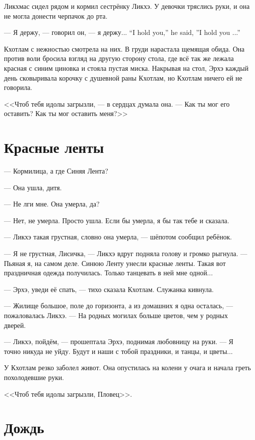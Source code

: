 Ликхмас сидел рядом и кормил сестрёнку Ликхэ.
У девочки тряслись руки, и она не могла донести черпачок до рта.

{--- Я держу, --- говорил он, --- я держу...}
{``I hold you,'' he said, ''I hold you ...''}

Кхотлам с нежностью смотрела на них.
В груди нарастала щемящая обида.
Она против воли бросила взгляд на другую сторону стола, где всё так же лежала красная с синим циновка и стояла пустая миска.
Накрывая на стол, Эрхэ каждый день сковыривала корочку с душевной раны Кхотлам, но Кхотлам ничего ей не говорила.

<<Чтоб тебя идолы загрызли, --- в сердцах думала она.
--- Как ты мог его оставить?
Как ты мог оставить меня?>>

\section{Красные ленты}

--- Кормилица, а где Синяя Лента?

--- Она ушла, дитя.

--- Не лги мне.
Она умерла, да?

--- Нет, не умерла.
Просто ушла.
Если бы умерла, я бы так тебе и сказала.

--- Ликхэ такая грустная, словно она умерла, --- шёпотом сообщил ребёнок.

--- Я не грустная, Лисичка, --- Ликхэ вдруг подняла голову и громко рыгнула.
--- Пьяная я, на самом деле.
Синюю Ленту унесли красные ленты.
Такая вот праздничная одежда получилась.
Только танцевать в ней мне одной...

--- Эрхэ, уведи её спать, --- тихо сказала Кхотлам.
Служанка кивнула.

--- Жилище большое, поле до горизонта, а из домашних я одна осталась, --- пожаловалась Ликхэ.
--- На родных могилах больше цветов, чем у родных дверей.

--- Ликхэ, пойдём, --- прошептала Эрхэ, поднимая любовницу на руки.
--- Я точно никуда не уйду.
Будут и наши с тобой праздники, и танцы, и цветы...

У Кхотлам резко заболел живот.
Она опустилась на колени у очага и начала греть похолодевшие руки.

<<Чтоб тебя идолы загрызли, Пловец>>.

\section{Дождь}

